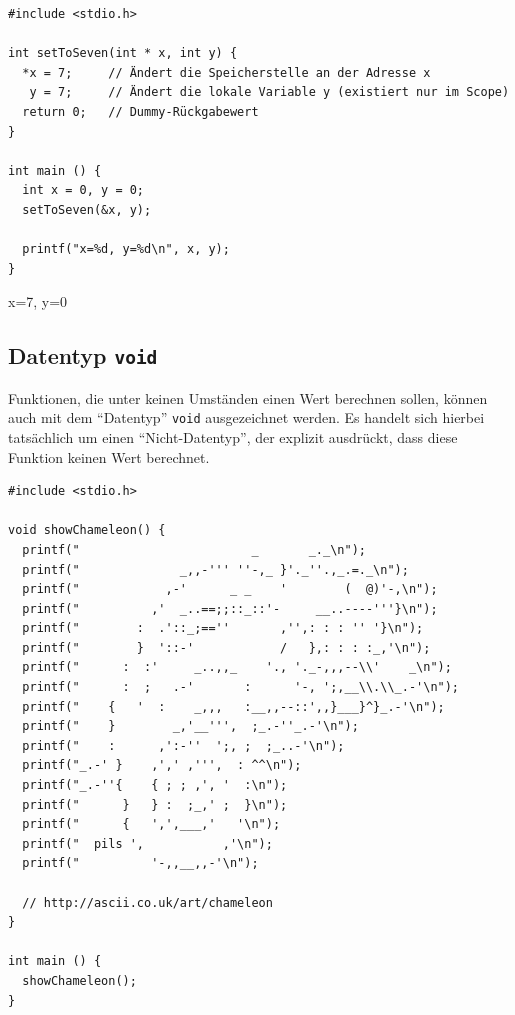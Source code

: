 \begin{codebox}
\begin{verbatim}
#include <stdio.h>

int setToSeven(int * x, int y) {
  *x = 7;     // Ändert die Speicherstelle an der Adresse x
   y = 7;     // Ändert die lokale Variable y (existiert nur im Scope)
  return 0;   // Dummy-Rückgabewert
}

int main () {
  int x = 0, y = 0;
  setToSeven(&x, y);
  
  printf("x=%d, y=%d\n", x, y);
}
\end{verbatim}
\end{codebox}

\begin{cmdbox}
x=7, y=0
\end{cmdbox}

\subsection{Datentyp \texttt{void}}
Funktionen, die unter keinen Umständen einen Wert berechnen sollen, können auch mit dem \enquote{Datentyp} \texttt{void} ausgezeichnet werden. Es handelt sich hierbei tatsächlich um einen \enquote{Nicht-Datentyp}, der explizit ausdrückt, dass diese Funktion keinen Wert berechnet.

\begin{codebox}
\begin{verbatim}
#include <stdio.h>

void showChameleon() {
  printf("                        _       _._\n");
  printf("              _,,-''' ''-,_ }'._''.,_.=._\n");
  printf("            ,-'      _ _    '        (  @)'-,\n");
  printf("          ,'  _..==;;::_::'-     __..----'''}\n");
  printf("        :  .'::_;==''       ,'',: : : '' '}\n");
  printf("        }  '::-'            /   },: : : :_,'\n");
  printf("      :  :'     _..,,_    '., '._-,,,--\\'    _\n");
  printf("      :  ;   .-'       :      '-, ';,__\\.\\_.-'\n");
  printf("    {   '  :    _,,,   :__,,--::',,}___}^}_.-'\n");
  printf("    }        _,'__''',  ;_.-''_.-'\n");
  printf("    :      ,':-''  ';, ;  ;_..-'\n");
  printf("_.-' }    ,',' ,''',  : ^^\n");
  printf("_.-''{    { ; ; ,', '  :\n");
  printf("      }   } :  ;_,' ;  }\n");
  printf("      {   ',',___,'   '\n");
  printf("  pils ',           ,'\n");
  printf("          '-,,__,,-'\n");
  
  // http://ascii.co.uk/art/chameleon
}

int main () {
  showChameleon();
}
\end{verbatim}
\end{codebox}

